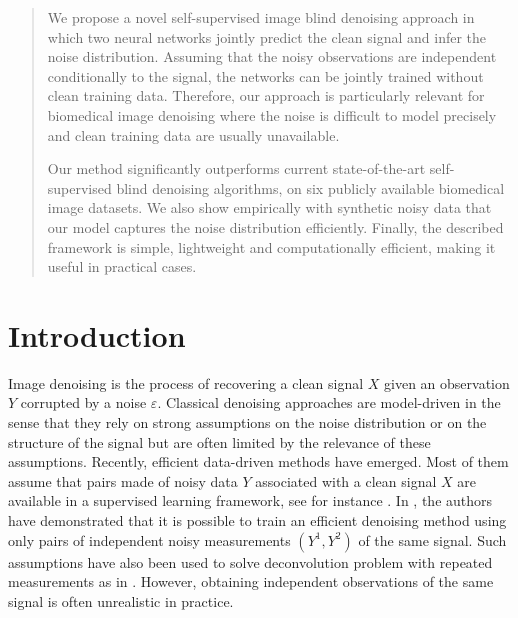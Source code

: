\documentclass{article}
\begin{document}
\printAffiliationsAndNotice{}  %


\begin{abstract}
We propose a novel self-supervised image blind denoising approach in which two neural networks jointly predict the clean signal and infer the noise distribution.
Assuming that the noisy observations are independent conditionally to the signal, the networks can be jointly trained without clean training data. Therefore, our approach is particularly relevant for biomedical image denoising where the noise is difficult to model precisely and clean training data are usually unavailable.

Our method significantly outperforms current state-of-the-art self-supervised blind denoising algorithms, on six publicly available biomedical image datasets. We also show empirically with synthetic noisy data that our model captures the noise distribution efficiently. Finally, the described framework is simple, lightweight and computationally efficient, making it useful in practical cases.
\end{abstract}

\section{Introduction}
\label{sec:introduction}

Image denoising is the process of recovering a clean signal $X$ given an observation $Y$ corrupted by a noise $\varepsilon$. Classical denoising approaches  are model-driven in the sense that they rely on strong assumptions on the noise distribution or on the structure of the signal but are often  limited by the relevance of these assumptions.
Recently, efficient data-driven methods have emerged. Most of them assume that pairs made of noisy data $Y$ associated with a clean signal $X$ are available in a supervised learning framework, see for instance \cite{weigert2017content}. In \cite{lehtinen2018noise2noise}, the authors have demonstrated that it is possible to train an efficient denoising method using only pairs of independent noisy measurements $(Y^1, Y^2)$ of the same signal. Such assumptions have also been used to solve deconvolution problem with repeated measurements as in \cite{delaigle2008deconvolution}. However, obtaining  independent observations of the same signal is often unrealistic in practice.
\end{document}
